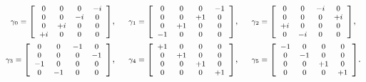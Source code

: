 \begin{equation}
\begin{gathered}
\mbox{ \footnotesize$
\gamma_0=
\left[
\begin{array}{cccc}
0 & 0 & 0 & -i \\
0 & 0 & -i & 0 \\
0 & +i & 0 & 0 \\
+i & 0 & 0 & 0 \\
\end{array}\right]
$\normalsize }, \quad
\mbox{ \footnotesize$
\gamma_1=
\left[
\begin{array}{cccc}
0 & 0 & 0 & -1 \\
0 & 0 & +1 & 0 \\
0 & +1 & 0 & 0 \\
-1 & 0 & 0 & 0 \\
\end{array}\right]
$\normalsize }, \quad
\mbox{ \footnotesize$
\gamma_2=
\left[
\begin{array}{cccc}
0 & 0 & -i & 0 \\
0 & 0 & 0 & +i \\
+i & 0 & 0 & 0 \\
0 & -i & 0 & 0 \\
\end{array}\right]
$\normalsize }, \\
\mbox{ \footnotesize$
\gamma_3=
\left[
\begin{array}{cccc}
0 & 0 & -1 & 0 \\
0 & 0 & 0 & -1 \\
-1 & 0 & 0 & 0 \\
0 & -1 & 0 & 0 \\
\end{array}\right]
$\normalsize }, \quad
\mbox{ \footnotesize$
\gamma_4=
\left[
\begin{array}{cccc}
+1 & 0 & 0 & 0 \\
0 & +1 & 0 & 0 \\
0 & 0 & +1 & 0 \\
0 & 0 & 0 & +1 \\
\end{array}\right]
$\normalsize }, \quad
\mbox{ \footnotesize$
\gamma_5=
\left[
\begin{array}{cccc}
-1 & 0 & 0 & 0 \\
0 & -1 & 0 & 0 \\
0 & 0 & +1 & 0 \\
0 & 0 & 0 & +1 \\
\end{array}\right]
$\normalsize }. \\
\end{gathered}
\end{equation}

